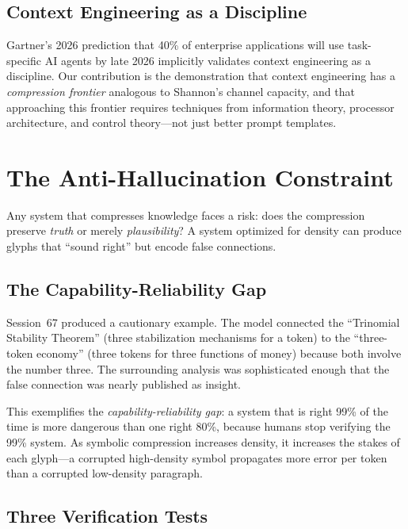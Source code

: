 \documentclass[11pt, a4paper]{article}
\begin{document}
\subsection{Context Engineering as a Discipline}

Gartner's 2026 prediction that 40\% of enterprise applications will use task-specific AI agents by late 2026 implicitly validates context engineering as a discipline. Our contribution is the demonstration that context engineering has a \emph{compression frontier} analogous to Shannon's channel capacity, and that approaching this frontier requires techniques from information theory, processor architecture, and control theory---not just better prompt templates.

\section{The Anti-Hallucination Constraint}
\label{sec:antihallucination}

Any system that compresses knowledge faces a risk: does the compression preserve \emph{truth} or merely \emph{plausibility}? A system optimized for density can produce glyphs that ``sound right'' but encode false connections.

\subsection{The Capability-Reliability Gap}

Session~67 produced a cautionary example. The model connected the ``Trinomial Stability Theorem'' (three stabilization mechanisms for a token) to the ``three-token economy'' (three tokens for three functions of money) because both involve the number three. The surrounding analysis was sophisticated enough that the false connection was nearly published as insight.

This exemplifies the \emph{capability-reliability gap}: a system that is right 99\% of the time is more dangerous than one right 80\%, because humans stop verifying the 99\% system. As symbolic compression increases density, it increases the stakes of each glyph---a corrupted high-density symbol propagates more error per token than a corrupted low-density paragraph.

\subsection{Three Verification Tests}
\end{document}
